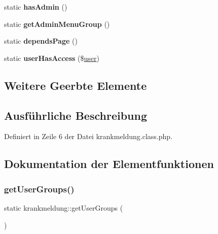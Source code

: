 \begin{DoxyCompactItemize}
\item 
\mbox{\label{classkrankmeldung_ae7adbfe2fc7162aed4b061dca58a60bb}} 
static {\bfseries has\+Admin} ()
\item 
\mbox{\label{classkrankmeldung_aea1b03b755502b42b10188a5e2c1592b}} 
static {\bfseries get\+Admin\+Menu\+Group} ()
\item 
\mbox{\label{classkrankmeldung_ab45e2ec6e62611b4ee62eca382a6191f}} 
static {\bfseries depends\+Page} ()
\item 
\mbox{\label{classkrankmeldung_aca3394302b0f4cfc21702c78439d7720}} 
static {\bfseries user\+Has\+Access} (\$\mbox{\hyperlink{classuser}{user}})
\end{DoxyCompactItemize}
\subsection*{Weitere Geerbte Elemente}


\subsection{Ausführliche Beschreibung}


Definiert in Zeile 6 der Datei krankmeldung.\+class.\+php.



\subsection{Dokumentation der Elementfunktionen}
\mbox{\label{classkrankmeldung_a9ec5ac0873845d5e4c931c5d575af23e}} 
\subsubsection{\texorpdfstring{get\+User\+Groups()}{getUserGroups()}\hspace{0.1cm}{\footnotesize\ttfamily [1/2]}}
{\footnotesize\ttfamily static krankmeldung\+::get\+User\+Groups (\begin{DoxyParamCaption}{ }\end{DoxyParamCaption})\hspace{0.3cm}{\ttfamily [static]}}

